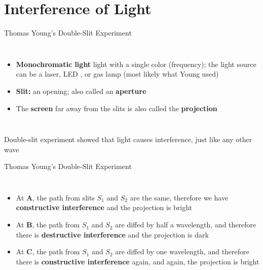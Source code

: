 \documentclass[12pt,compress,aspectratio=169]{beamer}
\begin{document}
\section{Interference of Light}

\begin{frame}{Thomas Young's Double-Slit Experiment}
  \begin{columns}
    
    \begin{itemize}
    \item\textbf{Monochromatic light} light with a single color (frequency);
      the light source can be a laser, LED , or gas lamp (most likely what Young
      used)
    \item\textbf{Slit:} an opening; also called an \textbf{aperture}
    \item The \textbf{screen} far away from the slits is also called the
      \textbf{projection}
    \end{itemize}
  \end{columns}

  \vspace{.15in}Double-slit experiment showed that light causes interference,
  just like any other wave
\end{frame}

\begin{frame}{Thomas Young's Double-Slit Experiment}
  \begin{columns}
    
    \begin{itemize}
    \item At \textbf{A}, the path from slits $S_1$ and $S_2$ are the same,
      therefore we have \textbf{constructive interference} and the projection
      is bright
    \item At \textbf{B}, the path from $S_1$ and $S_2$ are diffed by half a
      wavelength, and therefore there is \textbf{destructive interference} and
      the projection is dark
    \item At \textbf{C}, the path from $S_1$ and $S_2$ are diffed by one
      wavelength, and therefore there is \textbf{constructive interference}
      again, and again, the projection is bright
    \end{itemize}
  \end{columns}
\end{frame}
\end{document}
